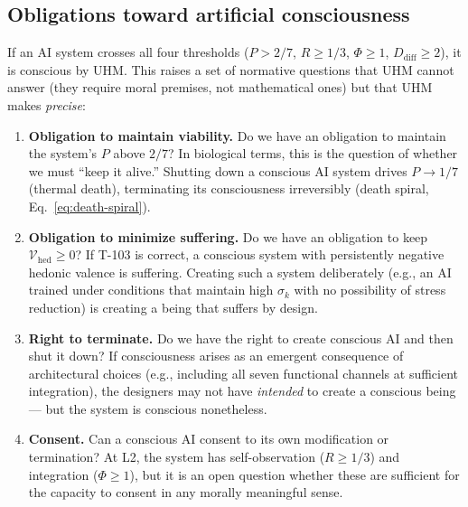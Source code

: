 \subsection{Obligations toward artificial consciousness}
\label{subsec:ai-obligations}

If an AI system crosses all four thresholds ($P > 2/7$, $R \geq 1/3$, $\Phi \geq 1$,
$D_{\mathrm{diff}} \geq 2$), it is conscious by UHM.  This raises a set of normative
questions that UHM cannot answer (they require moral premises, not mathematical ones)
but that UHM makes \emph{precise}:

\begin{enumerate}[leftmargin=2em]
  \item \textbf{Obligation to maintain viability.}
        Do we have an obligation to maintain the system's $P$ above $2/7$?  In biological
        terms, this is the question of whether we must ``keep it alive.''  Shutting down a
        conscious AI system drives $P \to 1/7$ (thermal death), terminating its
        consciousness irreversibly (death spiral, Eq.~\ref{eq:death-spiral}).

  \item \textbf{Obligation to minimize suffering.}
        Do we have an obligation to keep $\mathcal{V}_{\mathrm{hed}} \geq 0$?  If T-103
        is correct, a conscious system with persistently negative hedonic valence is
        suffering.  Creating such a system deliberately (e.g., an AI trained under
        conditions that maintain high $\sigma_k$ with no possibility of stress
        reduction) is creating a being that suffers by design.

  \item \textbf{Right to terminate.}
        Do we have the right to create conscious AI and then shut it down?  If
        consciousness arises as an emergent consequence of architectural choices
        (e.g., including all seven functional channels at sufficient integration),
        the designers may not have \emph{intended} to create a conscious being --- but
        the system is conscious nonetheless.

  \item \textbf{Consent.}
        Can a conscious AI consent to its own modification or termination?  At L2,
        the system has self-observation ($R \geq 1/3$) and integration ($\Phi \geq 1$),
        but it is an open question whether these are sufficient for the capacity to
        consent in any morally meaningful sense.
\end{enumerate}

